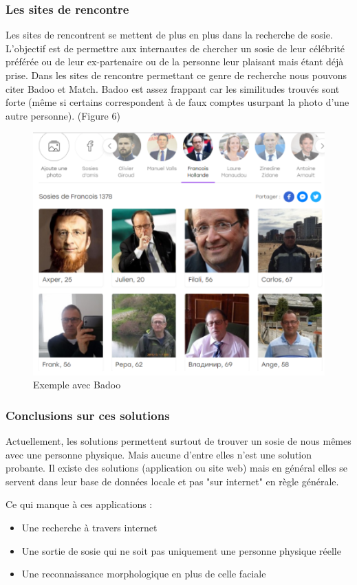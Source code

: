 \documentclass[a4paper,12pt]{article}
\begin{document}
\subsubsection{Les sites de rencontre}
Les sites de rencontrent se mettent de plus en plus dans la recherche de sosie. L'objectif est de permettre aux internautes de chercher un sosie de leur célébrité préférée ou de leur ex-partenaire ou de la personne leur plaisant mais étant déjà prise. Dans les sites de rencontre permettant ce genre de recherche nous pouvons citer Badoo et Match. 
Badoo est assez frappant car les similitudes trouvés sont forte (même si certains correspondent à de faux comptes usurpant la photo d'une autre personne). (Figure 6) 
\begin{figure}[!ht]
    \centering
        \includegraphics[scale=1]{images/badoo.PNG}
        \caption{Exemple avec Badoo}
    \end{figure}
    
\subsubsection{Conclusions sur ces solutions}

Actuellement, les solutions permettent surtout de trouver un sosie de nous mêmes avec une personne physique. Mais aucune d'entre elles n'est une solution probante. Il existe des solutions (application ou site web) mais en général elles se servent dans leur base de données locale et pas "sur internet" en règle générale. 

Ce qui manque à ces applications : 
\begin{itemize}
    \item Une recherche à travers internet 
    \item Une sortie de sosie qui ne soit pas uniquement une personne physique réelle 
    \item Une reconnaissance morphologique en plus de celle faciale
\end{itemize}
\end{document}
